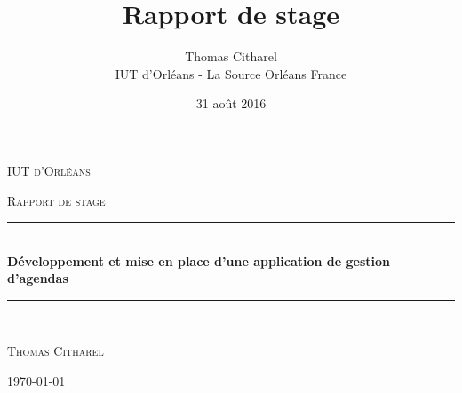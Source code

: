 \documentclass[10pt,a4paper, twoside]{report}
\author{Thomas Citharel\\
	IUT d'Orléans - La Source
	Orléans
	France}
\date{31 août 2016}
\title{Rapport de stage}
\newcommand{\HRule}{\rule{\linewidth}{0.5mm}}
\begin{document}
	\begin{titlepage}
		\center
		
		\textsc{\LARGE IUT d'Orléans}\\[1.5cm]
		{\scshape\Large Rapport de stage\par}
		\HRule \\[0.4cm]
		{ \huge \bfseries Développement et mise en place d'une application de gestion d'agendas}\\[0.4cm]
		\HRule \\[1.5cm]
		
		
		{\scshape\Large Thomas Citharel\par}
		{\large \today\par}
		
		\vspace{4cm}
		

\end{titlepage}
\end{document}
